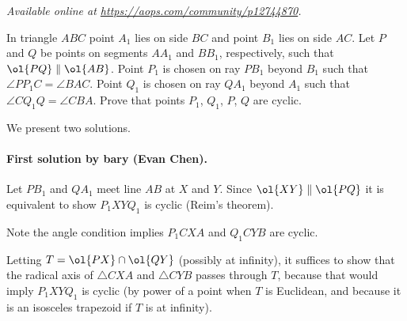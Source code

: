 \textsl{Available online at \url{https://aops.com/community/p12744870}.}
\begin{mdframed}[style=mdpurplebox,frametitle={Problem statement}]
In triangle $ABC$ point $A_1$ lies on side $BC$
and point $B_1$ lies on side $AC$.
Let $P$ and $Q$ be points on segments $AA_1$ and $BB_1$,
respectively, such that $\ol{PQ} \parallel \ol{AB}$.
Point $P_1$ is chosen on ray $PB_1$ beyond $B_1$
such that $\angle PP_1C = \angle BAC$.
Point $Q_1$ is chosen on ray $QA_1$ beyond $A_1$
such that $\angle CQ_1Q = \angle CBA$.
Prove that points $P_1$, $Q_1$, $P$, $Q$ are cyclic.
\end{mdframed}
We present two solutions.

\paragraph{First solution by bary (Evan Chen).}
Let $PB_1$ and $QA_1$ meet line $AB$ at $X$ and $Y$.
Since $\ol{XY} \parallel \ol{PQ}$ it is equivalent
to show $P_1XYQ_1$ is cyclic (Reim's theorem).

Note the angle condition implies $P_1CXA$ and $Q_1CYB$ are cyclic.

Letting $T = \ol{PX} \cap \ol{QY}$ (possibly at infinity),
it suffices to show that the
radical axis of $\triangle CXA$ and $\triangle CYB$ passes through $T$,
because that would imply $P_1XYQ_1$ is cyclic
(by power of a point when $T$ is Euclidean,
and because it is an isosceles trapezoid if $T$ is at infinity).

